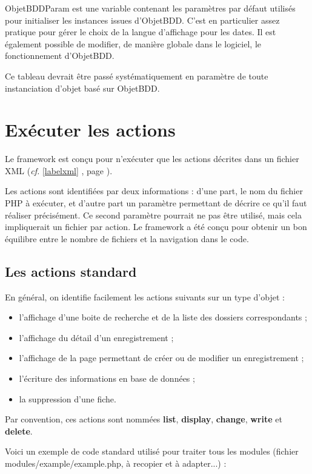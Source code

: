 ObjetBDDParam est une variable contenant les paramètres par défaut utilisés pour initialiser les instances issues d'ObjetBDD. C'est en particulier assez pratique pour gérer le choix de la langue d'affichage pour les dates. Il est également possible de modifier, de manière globale dans le logiciel, le fonctionnement d'ObjetBDD.

Ce tableau devrait être passé systématiquement en paramètre de toute instanciation d'objet basé sur ObjetBDD.

\chapter{Exécuter les actions}
Le framework est conçu pour n'exécuter que les actions décrites dans un fichier XML (\textit{cf.} \ref{labelxml} \textit{}, page \pageref{labelxml}).

Les actions sont identifiées par deux informations : d'une part, le nom du fichier PHP à exécuter, et d'autre part un paramètre permettant de décrire ce qu'il faut réaliser précisément. Ce second paramètre pourrait ne pas être utilisé, mais cela impliquerait un fichier par action. 
Le framework a été conçu pour obtenir un bon équilibre entre le nombre de fichiers et la navigation dans le code.

\section{Les actions standard}

En général, on identifie facilement les actions suivants sur un type d'objet :
\begin{itemize}
\item l'affichage d'une boite de recherche et de la liste des dossiers correspondants ;
\item l'affichage du détail d'un enregistrement ;
\item l'affichage de la page permettant de créer ou de modifier un enregistrement ;
\item l'écriture des informations en base de données ;
\item la suppression d'une fiche.
\end{itemize}

Par convention, ces actions sont nommées \textbf{list}, \textbf{display}, \textbf{change}, \textbf{write} et \textbf{delete}. 

Voici un exemple de code standard utilisé pour traiter tous les modules (fichier modules/example/example.php, à recopier et à adapter...) :

